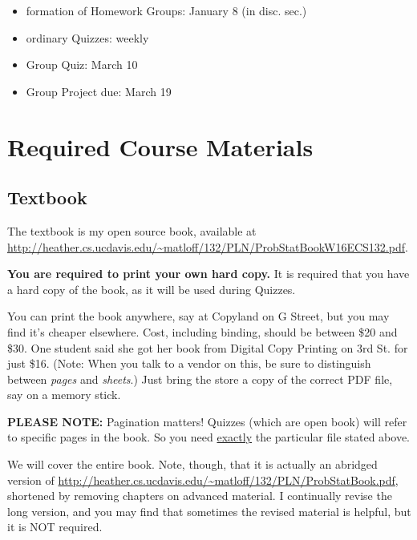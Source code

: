   




\begin{itemize}

\item formation of Homework Groups: January 8 (in disc. sec.)

\item ordinary Quizzes:  weekly

\item Group Quiz:  March 10

\item Group Project due:  March 19

\end{itemize}

\section{Required Course Materials}

\subsection{Textbook}
\label{text}

The textbook is my open source book, available at
\url{http://heather.cs.ucdavis.edu/~matloff/132/PLN/ProbStatBookW16ECS132.pdf}.

{\bf You are required to print your own hard copy.} It is required that
you have a hard copy of the book, as it will be used during Quizzes.

You can print the book anywhere, say at Copyland on G Street,
but you may find it's cheaper elsewhere.  Cost,
including binding, should be between \$20 and \$30.  One student said
she got her book from Digital Copy Printing on 3rd St. for just \$16.  (Note:
When you talk to a vendor on this, be sure to distinguish between {\it
pages} and {\it sheets}.)  Just bring the store a copy of the correct
PDF file, say on a memory stick.

{\bf PLEASE NOTE:}  Pagination matters!  Quizzes (which are open book)
will refer to specific pages in the book.  So you need
\underline{exactly} the particular file stated above.  

We will cover the entire book.  Note, though, that it is actually an
abridged version of 
\url{http://heather.cs.ucdavis.edu/~matloff/132/PLN/ProbStatBook.pdf},
shortened by removing chapters on advanced material.  I continually
revise the long version, and you may find that sometimes the revised
material is helpful, but it is NOT required.

